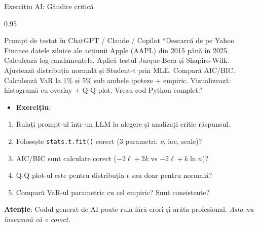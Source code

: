 \documentclass[9pt, aspectratio=169, t]{beamer}
\begin{document}
\begin{frame}{Exercițiu AI: Gândire critică}
\begin{cminipage}{0.95\textwidth}
    \vspace{-3mm}
    \begin{block}{\footnotesize Prompt de testat în ChatGPT / Claude / Copilot}
        {\footnotesize
        ``Descarcă de pe Yahoo Finance datele zilnice ale acțiunii Apple (AAPL) din 2015 până în 2025. Calculează log-randamentele. Aplică testul Jarque-Bera și Shapiro-Wilk. Ajustează distribuția normală și Student-t prin MLE. Compară AIC/BIC. Calculează VaR la 1\% și 5\% sub ambele ipoteze + empiric. Vizualizează: histogramă cu overlay + Q-Q plot. Vreau cod Python complet.''
        }
    \end{block}
    \vspace{-2mm}
    {\footnotesize
    \begin{itemize}\setlength{\itemsep}{0pt}
        \item \textbf{Exercițiu}:
    \end{itemize}
    \begin{enumerate}\setlength{\itemsep}{0pt}
        \item Rulați prompt-ul într-un LLM la alegere și analizați critic răspunsul.
        \item Folosește \texttt{stats.t.fit()} corect (3 parametri: $\nu$, loc, scale)?
        \item AIC/BIC sunt calculate corect ($-2\ell + 2k$ vs $-2\ell + k\ln n$)?
        \item Q-Q plot-ul este pentru distribuția $t$ sau doar pentru normală?
        \item Compară VaR-ul parametric cu cel empiric? Sunt consistente?
    \end{enumerate}
    }
    \vspace{-2mm}
    \begin{alertblock}{}
        {\footnotesize \textbf{Atenție}: Codul generat de AI poate rula fără erori și arăta profesional. \textit{Asta nu înseamnă că e corect.}}
    \end{alertblock}
\end{cminipage}
\end{frame}
\end{document}
